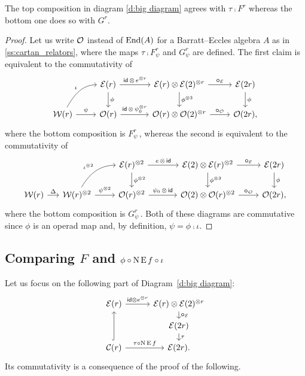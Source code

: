 \begin{lemma}\label{l:main_diag}
	The top composition in diagram \eqref{d:big diagram} agrees with $\tau \comp F^r$ whereas the bottom one does so with $G^r$.
\end{lemma}

\begin{proof}
	Let us write $\mathcal{O}$ instead of $\mathrm{End}(A)$ for a Barratt--Eccles algebra $A$ as in  \cref{ss:cartan_relators}, where the maps $\tau \comp F_\psi^r$ and $G_\psi^r$ are defined.
	The first claim is equivalent to the commutativity of
	\[
	\begin{tikzcd}
		&
		\BE(r) \arrow[d,"\phi"] \arrow[r,"\id\, \ot\, e^{\ot r}"] &[10pt]
		\BE(r) \ot \BE(2)^{\ot r} \arrow[d,"\phi^{\ot 3}"] \arrow[r,"\bcirc_{\BE}"] &
		\BE(2r) \arrow[d,"\phi"] \\
		\cW(r) \arrow[r,"\psi"] \arrow[ur, in=180, out=60,"\iota"] &
		\cO(r) \arrow[r,"\id\, \ot\, \psi_0^{\ot r}"] &
		\cO(r) \ot \cO(2)^{\ot r} \arrow[r,"\bcirc_{\cO}"] &
		\cO(2r),
	\end{tikzcd}
	\]
	where the bottom composition is $F_\psi^r$\,, whereas the second is equivalent to the commutativity of
	\[
	\begin{tikzcd}
		&[-10pt] &
		\BE(r)^{\ot2} \arrow[d,"\phi^{\ot 2}"] \arrow[r,"e\,\ot\,\id"] &[10pt]
		\BE(2) \ot \BE(r)^{\ot2} \arrow[d,"\phi^{\ot 3}"] \arrow[r,"\bcirc_{\BE}"] &
		\BE(2r) \arrow[d,"\phi"] \\
		\cW(r) \arrow[r,"\Delta"] &
		\cW(r)^{\ot 2} \arrow[r,"\psi^{\ot 2}"] \arrow[ur, in=180, out=60,"\iota^{\ot 2}"] &
		\cO(r)^{\ot 2} \arrow[r,"\psi_0\,\ot\,\id"] &
		\cO(2) \ot \cO(r)^{\ot 2} \arrow[r,"\bcirc_{\cO}"] &
		\cO(2r),
	\end{tikzcd}
	\]
	where the bottom composition is $G_\psi^r$\,.
	Both of these diagrams are commutative since $\phi$ is an operad map and, by definition, $\psi = \phi \comp \iota$.
\end{proof}

\subsection{Comparing $F$ and $\phi \mathbin{\circ} \operatorname{N}\operatorname{E} f \mathbin{\circ} \iota$}

Let us focus on the following part of Diagram~\eqref{d:big diagram}:
\[
\begin{tikzcd}[row sep=small]
	\BE(r) \arrow[r,"\id \ot e^{\ot r}"] &[5pt]
	\BE(r) \ot \BE(2)^{\ot r} \arrow[d,"\bcirc_{\BE}"] \\ &
	\BE(2r) \arrow[d, "\tau"] \\
	\cC(r) \arrow[uu,hook] \arrow[r,"\tau \comp \chains\EE f"] & \BE(2r).
\end{tikzcd}
\]
Its commutativity is a consequence of the proof of the following.

